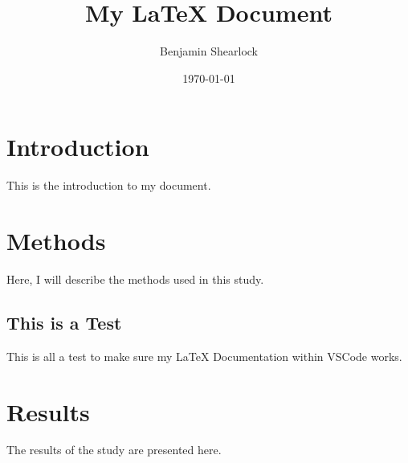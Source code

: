 \documentclass{article}
\title{My LaTeX Document}
\author{Benjamin Shearlock}
\date{\today}
\begin{document}
\maketitle

\section{Introduction}
This is the introduction to my document.

\section{Methods}
Here, I will describe the methods used in this study.

\subsection{This is a Test}
This is all a test to make sure my LaTeX Documentation within VSCode works.

\section{Results}
The results of the study are presented here.
\end{document}
